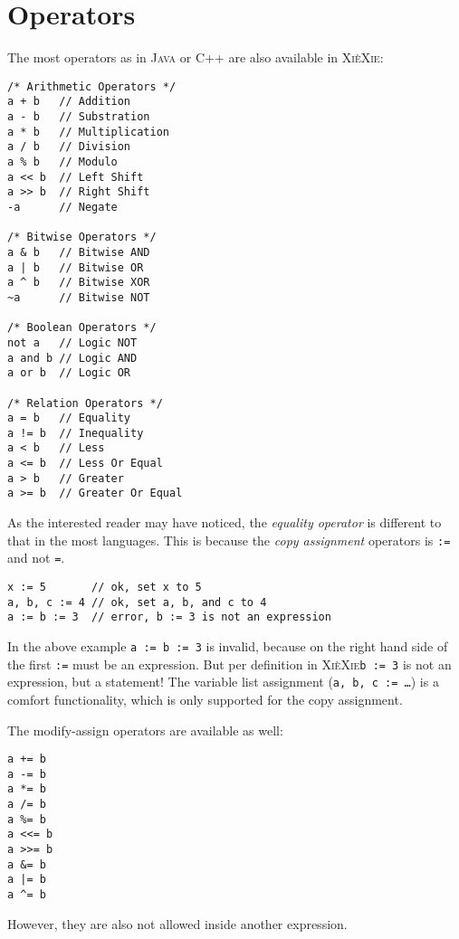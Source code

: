 \documentclass{report}
\def\xiexie{\textsc{Xi\`eXie}\xspace}
\def\cpp{\textsc{C++}\xspace}
\def\java{\textsc{Java}\xspace}
\begin{document}

\section{Operators}

The most operators as in \java or \cpp are also available in \xiexie:
\begin{lstlisting}
/* Arithmetic Operators */
a + b   // Addition
a - b   // Substration
a * b   // Multiplication
a / b   // Division
a % b   // Modulo
a << b  // Left Shift
a >> b  // Right Shift
-a      // Negate

/* Bitwise Operators */
a & b   // Bitwise AND
a | b   // Bitwise OR
a ^ b   // Bitwise XOR
~a      // Bitwise NOT

/* Boolean Operators */
not a   // Logic NOT
a and b // Logic AND
a or b  // Logic OR

/* Relation Operators */
a = b   // Equality
a != b  // Inequality
a < b   // Less
a <= b  // Less Or Equal
a > b   // Greater
a >= b  // Greater Or Equal
\end{lstlisting}
As the interested reader may have noticed, the \textit{equality operator} is different to that in the most languages.
This is because the \textit{copy assignment} operators is \texttt{:=} and not \texttt{=}.
\begin{lstlisting}
x := 5       // ok, set x to 5
a, b, c := 4 // ok, set a, b, and c to 4
a := b := 3  // error, b := 3 is not an expression
\end{lstlisting}
In the above example \texttt{a := b := 3} is invalid, because on the right hand side of the first \texttt{:=} must be
an expression. But per definition in \xiexie \texttt{b := 3} is not an expression, but a statement!
The variable list assignment (\texttt{a, b, c := \dots}) is a comfort functionality, which is only supported for the
copy assignment.

The modify-assign operators are available as well:
\begin{lstlisting}
a += b
a -= b
a *= b
a /= b
a %= b
a <<= b
a >>= b
a &= b
a |= b
a ^= b
\end{lstlisting}
However, they are also not allowed inside another expression.


\end{document}
